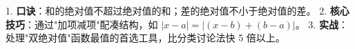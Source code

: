 \begin{summarybox}
1. \textbf{口诀}：和的绝对值不超过绝对值的和；差的绝对值不小于绝对值的差。
2. \textbf{核心技巧}：通过"加项减项"配凑结构，如 $|x-a| = |(x-b) + (b-a)|$。
3. \textbf{实战}：处理"双绝对值"函数最值的首选工具，比分类讨论法快 5 倍以上。
\end{summarybox}